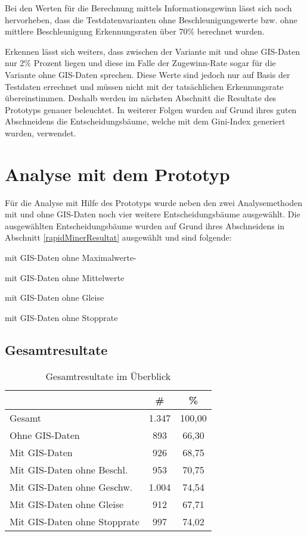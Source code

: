 Bei den Werten für die Berechnung mittels Informationsgewinn lässt sich noch hervorheben, dass die Testdatenvarianten ohne Beschleunigungswerte bzw. ohne mittlere Beschleunigung Erkennungsraten über 70\% berechnet wurden. 

Erkennen lässt sich weiters, dass zwischen der Variante mit und ohne GIS-Daten nur 2\% Prozent liegen und diese im Falle der Zugewinn-Rate sogar für die Variante ohne GIS-Daten sprechen. Diese Werte sind jedoch nur auf Basis der Testdaten errechnet und müssen nicht mit der tatsächlichen Erkennungsrate übereinstimmen. Deshalb werden im nächsten Abschnitt die Resultate des Prototyps genauer beleuchtet. In weiterer Folgen wurden auf Grund ihres guten Abschneidens die Entscheidungsbäume, welche mit dem Gini-Index generiert wurden, verwendet.

\section{Analyse mit dem Prototyp}
Für die Analyse mit Hilfe des Prototyps wurde neben den zwei Analysemethoden mit und ohne GIS-Daten noch vier weitere Entscheidungsbäume ausgewählt. Die ausgewählten Entscheidungsbäume wurden auf Grund ihres Abschneidens in Abschnitt \ref{rapidMinerResultat}  ausgewählt und sind folgende:
\begin{pitemize}
\item mit GIS-Daten ohne Maximalwerte-
\item mit GIS-Daten ohne Mittelwerte
\item mit GIS-Daten ohne Gleise
\item mit GIS-Daten ohne Stopprate
\end{pitemize}

\subsection{Gesamtresultate}

\begin{table}[h]
\centering
\begin{tabular}{|l|c|c|}
\hline
 & \# & \% \\ \hline
Gesamt & 1.347 & 100,00 \\ \hline
Ohne GIS-Daten & 893 & 66,30 \\ \hline
Mit GIS-Daten & 926 & 68,75 \\ \hline
Mit GIS-Daten ohne Beschl. & 953 & 70,75 \\ \hline
Mit GIS-Daten ohne Geschw. & 1.004 & 74,54 \\ \hline
Mit GIS-Daten ohne Gleise & 912 & 67,71 \\ \hline
Mit GIS-Daten ohne Stopprate & 997 & 74,02 \\ \hline
\end{tabular}
\caption{Gesamtresultate im Überblick}
\label{my-label}
\end{table}


